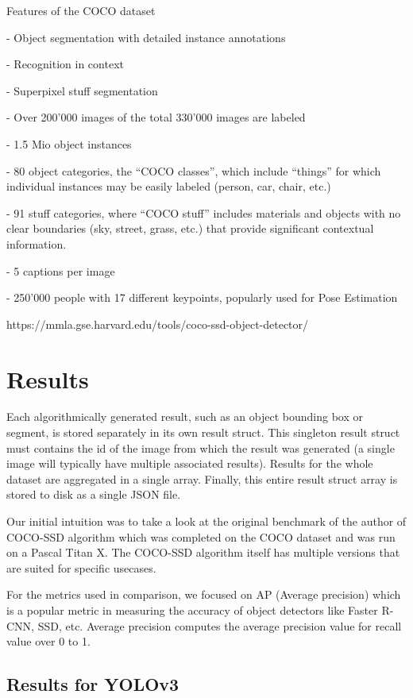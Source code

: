 \documentclass[runningheads,a4paper,11pt]{report}
\begin{document}
Features of the COCO dataset

    - Object segmentation with detailed instance annotations
    
    - Recognition in context
    
    - Superpixel stuff segmentation
    
    - Over 200’000 images of the total 330’000 images are labeled
    
    - 1.5 Mio object instances
    
    - 80 object categories, the “COCO classes”, which include “things” for which individual instances may be easily labeled (person, car, chair, etc.)
    
    - 91 stuff categories, where “COCO stuff” includes materials and objects with no clear boundaries (sky, street, grass, etc.) that provide significant contextual information.
    
    - 5 captions per image
    
    - 250’000 people with 17 different keypoints, popularly used for Pose Estimation


https://mmla.gse.harvard.edu/tools/coco-ssd-object-detector/


\section{Results}
\label{section:results}

Each algorithmically generated result, such as an object bounding box or segment, is stored separately in its own result struct. This singleton result struct must contains the id of the image from which the result was generated (a single image will typically have multiple associated results). Results for the whole dataset are aggregated in a single array. Finally, this entire result struct array is stored to disk as a single JSON file.

Our initial intuition was to take a look at the original benchmark of the author of COCO-SSD algorithm which was completed on the COCO dataset and was run on a Pascal Titan X. The COCO-SSD algorithm itself has multiple versions that are suited for specific usecases.

For the metrics used in comparison, we focused on AP (Average precision) which is a popular metric in measuring the accuracy of object detectors like Faster R-CNN, SSD, etc. Average precision computes the average precision value for recall value over 0 to 1. 

\subsection{Results for YOLOv3}
\label{subsection:discussion}
\end{document}
